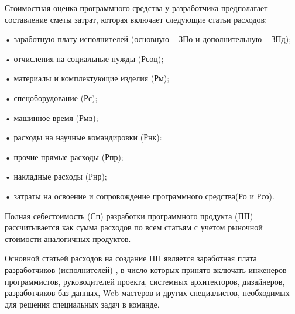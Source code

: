 {\gostFont
	
	\par \redline Стоимостная оценка программного средства у разработчика предполагает составление сметы затрат, которая включает следующие статьи расходов:
	
	\par \redline • заработную плату исполнителей (основную – ЗПо и дополнительную – ЗПд);
	\par \redline •	отчисления на социальные нужды (Рсоц);
	\par \redline •	материалы и комплектующие изделия (Рм);
	\par \redline •	спецоборудование (Рс);
	\par \redline •	машинное время (Рмв);
	\par \redline •	расходы на научные командировки (Рнк):
	\par \redline •	прочие прямые расходы (Рпр);
	\par \redline •	накладные расходы (Рнр);
	\par \redline •	затраты на освоение и сопровождение программного средства(Ро и Рсо).
	
	\par \redline Полная себестоимость (Сп) разработки программного продукта (ПП) рассчитывается как сумма расходов по всем статьям с учетом рыночной стоимости аналогичных продуктов.
	
	\par \redline Основной статьей расходов на создание ПП является заработная плата разработчиков (исполнителей) , в число которых принято включать инженеров-программистов, руководителей проекта, системных архитекторов, дизайнеров, разработчиков баз данных, Web-мастеров и других специалистов, необходимых для решения специальных задач в команде.
	 
}
